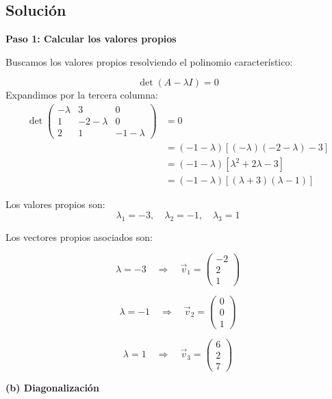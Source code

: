 \documentclass[a4paper]{article}
\begin{document}
\begin{enumerate}
\subsection*{Solución}

\textbf{Paso 1: Calcular los valores propios}

Buscamos los valores propios resolviendo el polinomio característico:

\[
\det(A - \lambda I) = 0
\]
Expandimos por la tercera columna:
\begin{align*}
    \det
\begin{pmatrix}
-\lambda & 3 & 0 \\
1 & -2 - \lambda & 0 \\
2 & 1 & -1 - \lambda
\end{pmatrix}
&= 0\\
&= (-1-\lambda)[(- \lambda)(-2 - \lambda)-3]\\
&= (-1-\lambda)[\lambda^2 + 2\lambda-3]\\
&= (-1-\lambda)[(\lambda+3)(\lambda-1)]
\end{align*}

Los valores propios son:
\[
\boxed{\lambda_1 = -3, \quad \lambda_2 = -1, \quad \lambda_3 = 1}
\]

Los vectores propios asociados son:

\[
\lambda = -3 \quad \Rightarrow \quad 
\vec{v}_1 = 
\begin{pmatrix}
-2 \\
2 \\
1
\end{pmatrix}
\]

\[
\lambda = -1 \quad \Rightarrow \quad 
\vec{v}_2 = 
\begin{pmatrix}
0 \\
0 \\
1
\end{pmatrix}
\]

\[
\lambda = 1 \quad \Rightarrow \quad 
\vec{v}_3 = 
\begin{pmatrix}
6 \\
2 \\
7
\end{pmatrix}
\]

\textbf{(b) Diagonalización}


\end{enumerate}
\end{document}

